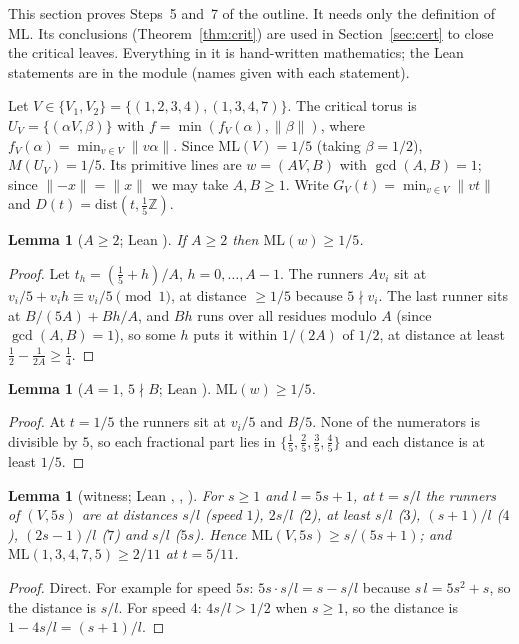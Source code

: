 \documentclass[11pt]{article}
\newtheorem{lemma}[theorem]{Lemma}
\theoremstyle{remark}
\newcommand{\ML}{\mathrm{ML}}
\newcommand{\Z}{\mathbb{Z}}
\newcommand{\dist}[1]{\lVert #1\rVert}
\begin{document}
This section proves Steps~5 and~7 of the outline. It needs only the definition of $\ML$. Its conclusions (Theorem~\ref{thm:crit}) are used in Section~\ref{sec:cert} to close the critical leaves. Everything in it is hand-written mathematics; the Lean statements are in the module  (names given with each statement).

Let $V\in\{V_1,V_2\}=\{(1,2,3,4),(1,3,4,7)\}$. The critical torus is $U_V=\{(\alpha V,\beta)\}$ with $f=\min(f_V(\alpha),\dist\beta)$, where $f_V(\alpha)=\min_{v\in V}\dist{v\alpha}$. Since $\ML(V)=1/5$ (taking $\beta=1/2$), $M(U_V)=1/5$. Its primitive lines are $w=(AV,B)$ with $\gcd(A,B)=1$; since $\dist{-x}=\dist x$ we may take $A,B\ge1$. Write $G_V(t)=\min_{v\in V}\dist{vt}$ and $D(t)=\mathrm{dist}(t,\tfrac15\Z)$.

\begin{lemma}[$A\ge2$; Lean ]\label{lem:P}
If $A\ge2$ then $\ML(w)\ge1/5$.
\end{lemma}
\begin{proof}
Let $t_h=(\tfrac15+h)/A$, $h=0,\dots,A-1$. The runners $Av_i$ sit at $v_i/5+v_ih\equiv v_i/5\pmod 1$, at distance $\ge1/5$ because $5\nmid v_i$. The last runner sits at $B/(5A)+Bh/A$, and $Bh$ runs over all residues modulo $A$ (since $\gcd(A,B)=1$), so some $h$ puts it within $1/(2A)$ of $1/2$, at distance at least $\tfrac12-\tfrac1{2A}\ge\tfrac14$.
\end{proof}
\begin{lemma}[$A=1$, $5\nmid B$; Lean ]\label{lem:N}
$\ML(w)\ge1/5$.
\end{lemma}
\begin{proof}
At $t=1/5$ the runners sit at $v_i/5$ and $B/5$. None of the numerators is divisible by $5$, so each fractional part lies in $\{\tfrac15,\tfrac25,\tfrac35,\tfrac45\}$ and each distance is at least $1/5$.
\end{proof}
\begin{lemma}[witness; Lean , , ]\label{lem:W}
For $s\ge1$ and $l=5s+1$, at $t=s/l$ the runners of $(V,5s)$ are at distances $s/l$ (speed $1$), $2s/l$ ($2$), at least $s/l$ ($3$), $(s+1)/l$ ($4$), $(2s-1)/l$ ($7$) and $s/l$ ($5s$). Hence $\ML(V,5s)\ge s/(5s+1)$; and $\ML(1,3,4,7,5)\ge2/11$ at $t=5/11$.
\end{lemma}
\begin{proof}
Direct. For example for speed $5s$: $5s\cdot s/l=s-s/l$ because $s\,l=5s^2+s$, so the distance is $s/l$. For speed $4$: $4s/l>1/2$ when $s\ge1$, so the distance is $1-4s/l=(s+1)/l$.
\end{proof}
\end{document}
